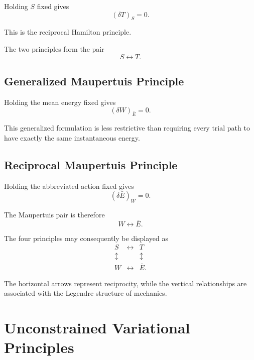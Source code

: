 Holding $S$ fixed gives
\begin{equation}
\boxed{
(\delta T)_S=0.
}
\end{equation}

This is the reciprocal Hamilton principle.

The two principles form the pair
\begin{equation}
\boxed{
S\longleftrightarrow T.
}
\end{equation}

\subsection{Generalized Maupertuis Principle}

Holding the mean energy fixed gives
\begin{equation}
\boxed{
(\delta W)_{\bar E}=0.
}
\end{equation}

This generalized formulation is less restrictive than requiring every trial path to have exactly the same instantaneous energy.

\subsection{Reciprocal Maupertuis Principle}

Holding the abbreviated action fixed gives
\begin{equation}
\boxed{
(\delta\bar E)_W=0.
}
\end{equation}

The Maupertuis pair is therefore
\begin{equation}
\boxed{
W\longleftrightarrow\bar E.
}
\end{equation}

The four principles may consequently be displayed as
\begin{equation}
\boxed{
\begin{array}{ccc}
S &\longleftrightarrow&T\\
\updownarrow&&\updownarrow\\
W&\longleftrightarrow&\bar E .
\end{array}}
\label{eq:four-principles}
\end{equation}

The horizontal arrows represent reciprocity, while the vertical relationships are associated with the Legendre structure of mechanics.

\section{Unconstrained Variational Principles}

